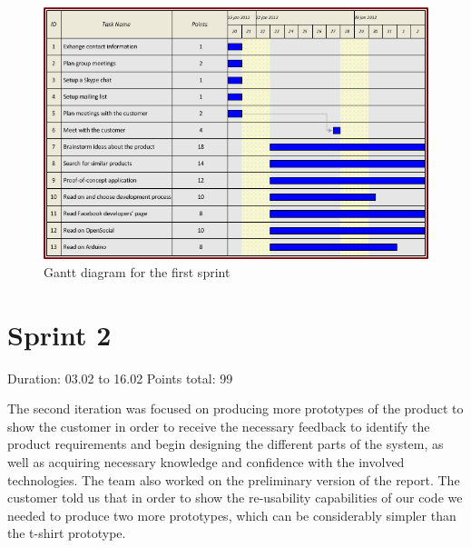 \begin{figure}[h!]
\centering \includegraphics[scale=0.8]{img/sprints-gantt1.png}
\caption{Gantt diagram for the first sprint}
\label{fig:sprints-gantt1}
\end{figure}

\newpage


\section{Sprint 2}

Duration: 03.02 to 16.02
Points total: 99

The second iteration was focused on producing more prototypes of the product to
show the customer in order to receive the necessary feedback to identify
the product requirements and begin designing the different parts of the system,
as well as acquiring necessary knowledge and confidence with the involved
technologies. The team also worked on the preliminary version of the report.
The customer told us that in order to show the re-usability capabilities of
our code we needed to produce two more prototypes, which can be considerably
simpler than the t-shirt prototype.

